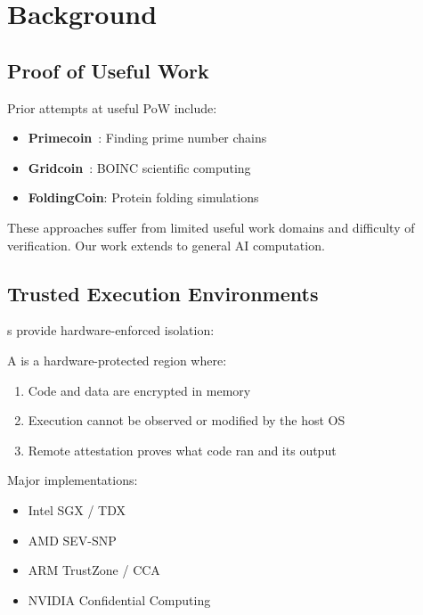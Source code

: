 \section{Background}


\subsection{Proof of Useful Work}

Prior attempts at useful PoW include:

\begin{itemize}
    \item \textbf{Primecoin}~\cite{king2013primecoin}: Finding prime number chains
    \item \textbf{Gridcoin}~\cite{gridcoin2014}: BOINC scientific computing
    \item \textbf{FoldingCoin}: Protein folding simulations
\end{itemize}

These approaches suffer from limited useful work domains and difficulty of verification. Our work extends to general AI computation.

\subsection{Trusted Execution Environments}

\TEE{}s provide hardware-enforced isolation:

\begin{definition}
A \TEE{} is a hardware-protected region where:
\begin{enumerate}
    \item Code and data are encrypted in memory
    \item Execution cannot be observed or modified by the host OS
    \item Remote attestation proves what code ran and its output
\end{enumerate}
\end{definition}

Major \TEE{} implementations:
\begin{itemize}
    \item Intel SGX / TDX
    \item AMD SEV-SNP
    \item ARM TrustZone / CCA
    \item NVIDIA Confidential Computing
\end{itemize}

